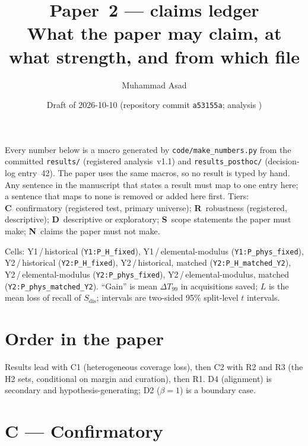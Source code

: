 \documentclass[10pt,a4paper]{article}
\title{Paper~2 --- claims ledger\\[2pt]\large What the paper may claim, at what strength, and from which file}
\author{Muhammad Asad}
\date{Draft of 2026-10-10 \quad (repository commit \texttt{a53155a}; analysis \texttt{\R{summary/analysis_sha}})}
\newcommand{\cellA}{Y1\,/\,historical}
\newcommand{\cellB}{Y1\,/\,elemental-modulus}
\newcommand{\cellC}{Y2\,/\,historical}
\newcommand{\cellD}{Y2\,/\,historical, matched}
\newcommand{\cellE}{Y2\,/\,elemental-modulus}
\newcommand{\cellF}{Y2\,/\,elemental-modulus, matched}
\newcommand{\Sdis}{$S_{\mathrm{dis}}$}
\begin{document}
\sloppy
\maketitle

\noindent Every number below is a macro generated by \texttt{code/make\_numbers.py} from the committed
\texttt{results/} (registered analysis~v1.1) and \texttt{results\_posthoc/} (decision-log entry~42). The
paper uses the same macros, so no result is typed by hand. Any sentence in the manuscript that
states a result must map to one entry here; a sentence that maps to none is removed or added here
first. Tiers: \textbf{C}~confirmatory (registered test, primary universe); \textbf{R}~robustness
(registered, descriptive); \textbf{D}~descriptive or exploratory; \textbf{S}~scope statements the
paper must make; \textbf{N}~claims the paper must not make.

Cells: \cellA{} (\texttt{Y1:P\_H\_fixed}), \cellB{} (\texttt{Y1:P\_phys\_fixed}), \cellC{}
(\texttt{Y2:P\_H\_fixed}), \cellD{} (\texttt{Y2:P\_H\_matched\_Y2}), \cellE{} (\texttt{Y2:P\_phys\_fixed}),
\cellF{} (\texttt{Y2:P\_phys\_matched\_Y2}). ``Gain'' is mean $\Delta T_{99}$ in acquisitions saved;
$L$ is the mean loss of recall of \Sdis{}; intervals are two-sided 95\% split-level $t$ intervals.

\section*{Order in the paper}
Results lead with C1 (heterogeneous coverage loss), then C2 with R2 and R3 (the H2 sets, conditional on margin and curation), then R1. D4 (alignment) is
secondary and hypothesis-generating; D2 ($\beta=1$) is a boundary case.

\section*{C --- Confirmatory}
\end{document}

